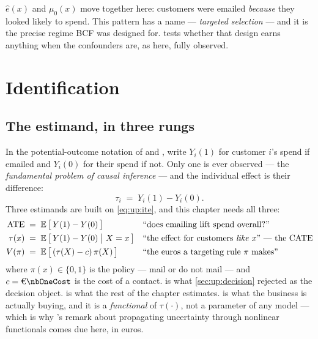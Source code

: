 



\begin{remark}
$\hat e(x)$ and $\mu_0(x)$ move together here: customers were emailed \emph{because} they looked
likely to spend. This pattern has a name --- \emph{targeted selection} \citep{hahn2020} --- and it
is the precise regime BCF was designed for.  tests whether that design earns
anything when the confounders are, as here, fully observed.
\end{remark}

\section{Identification}
\label{sec:up:ident}

\subsection*{The estimand, in three rungs}

In the potential-outcome notation of \citet{rubin1974} and \citet{imbens2015}, write $Y_i(1)$ for
customer $i$'s spend if emailed and $Y_i(0)$ for their spend if not. Only one is ever observed ---
the \emph{fundamental problem of causal inference} \citep{holland1986} --- and the individual
effect is their difference:
%
\begin{equation}
  \tau_i \;=\; Y_i(1) - Y_i(0).
  \label{eq:up:ite}
\end{equation}
%
Three estimands are built on \cref{eq:up:ite}, and this chapter needs all three:
%
\begin{align}
  \text{ATE} &\;=\; \operatorname{\mathbb{E}}\big[\,Y(1) - Y(0)\,\big]
    &&\text{``does emailing lift spend overall?''} \label{eq:up:ate}\\
  \tau(x) &\;=\; \operatorname{\mathbb{E}}\big[\,Y(1) - Y(0) \;\big|\; X = x\,\big]
    &&\text{``the effect for customers \emph{like} $x$'' --- the CATE} \label{eq:up:cate}\\
  V(\pi) &\;=\; \operatorname{\mathbb{E}}\big[\,(\tau(X) - c)\,\pi(X)\,\big]
    &&\text{``the euros a targeting rule $\pi$ makes''} \label{eq:up:policy}
\end{align}
%
where $\pi(x) \in \{0, 1\}$ is the policy --- mail or do not mail --- and $c = \eur{\nbOneCost}$
is the cost of a contact.  is what \cref{sec:up:decision} rejected as the
decision object.  is what the rest of the chapter estimates.
 is what the business is actually buying, and it is a \emph{functional} of
$\tau(\cdot)$, not a parameter of any model --- which is why 's remark about
propagating uncertainty through nonlinear functionals comes due here, in euros.

